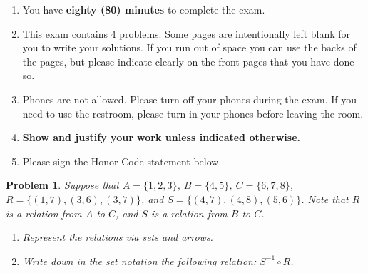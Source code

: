 \documentclass[]{exam}  %
\newtheorem{problem}{Problem}
\begin{document}
	\begin{enumerate}
		\item You have \textbf{eighty (80) minutes} to complete the exam.  
		\item This exam contains 4 problems. Some pages are intentionally left blank for you to write your solutions. If you run out of space you can use the backs of the pages, but please indicate clearly on the front pages that you have done so.
		
		
		\item Phones are not allowed. Please turn off your phones during the exam.
            If you need to use the restroom, please turn in your phones before leaving the room.
		
		\item \textbf{Show and justify your work unless indicated otherwise.}

		\item Please sign the Honor Code statement below.
	\end{enumerate}
	


    \newpage
\begin{problem}
    Suppose that $A = \{1,2,3\}$, $B = \{4,5\}$, $C = \{6,7,8\}$, $R = \{(1,7), (3,6), (3,7)\}$, and $S = \{(4,7), (4,8), (5,6)\}$. Note that $R$ is a relation from $A$ to $C$, and $S$ is a relation from $B$ to $C$. 

    \begin{enumerate}
        \item Represent the relations via sets and arrows.
        \item Write down in the set notation the following relation: 
         $S^{-1} \circ R$.
    \end{enumerate}
    \newpage

\end{problem}
\end{document}
